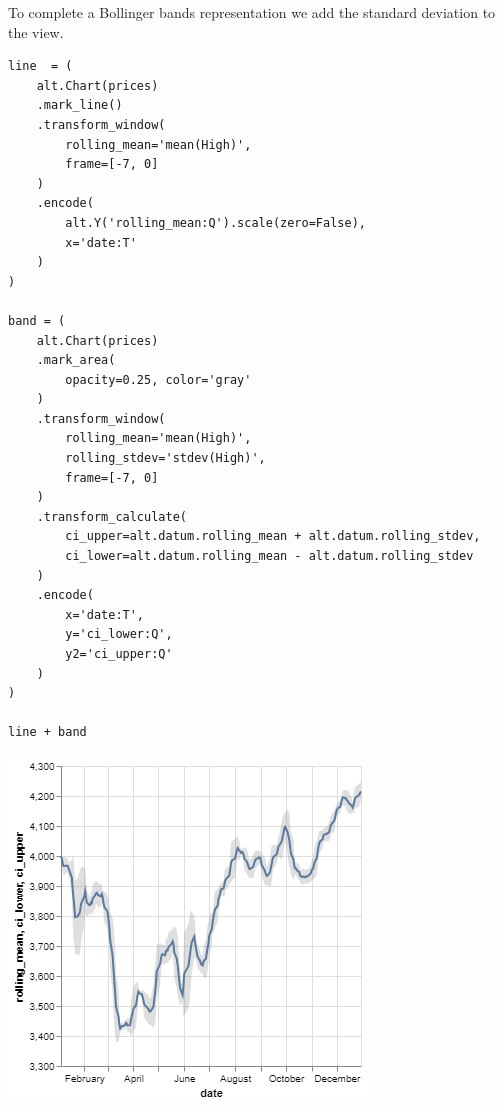 \documentclass[11pt]{article}
\begin{document}
To complete a Bollinger bands representation we add the standard deviation to the view.

\begin{verbatim}
line  = (
    alt.Chart(prices)
    .mark_line()
    .transform_window(
        rolling_mean='mean(High)',
        frame=[-7, 0]
    )
    .encode(
        alt.Y('rolling_mean:Q').scale(zero=False),
        x='date:T'
    )
)

band = (
    alt.Chart(prices)
    .mark_area(
        opacity=0.25, color='gray'
    )
    .transform_window(
        rolling_mean='mean(High)',
        rolling_stdev='stdev(High)',
        frame=[-7, 0]
    )
    .transform_calculate(
        ci_upper=alt.datum.rolling_mean + alt.datum.rolling_stdev,
        ci_lower=alt.datum.rolling_mean - alt.datum.rolling_stdev
    )
    .encode(
        x='date:T',
        y='ci_lower:Q',
        y2='ci_upper:Q'
    )
)

line + band
\end{verbatim}

\begin{center}
\includegraphics[width=.7\textwidth]{visualization (10).png}
\end{center}
\end{document}
